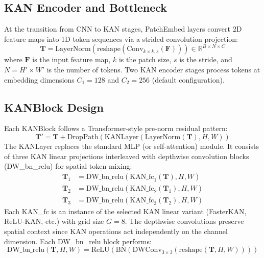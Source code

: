 \documentclass[a4paper]{report}
\begin{document}
\subsection{KAN Encoder and Bottleneck}
At the transition from CNN to KAN stages, PatchEmbed layers convert 2D feature maps into 1D token sequences via a strided convolution projection:
\begin{equation}
    \mathbf{T} = \text{LayerNorm}\left(\text{reshape}\left(\text{Conv}_{k \times k, s}(\mathbf{F})\right)\right) \in \mathbb{R}^{B \times N \times C}
\end{equation}
where $\mathbf{F}$ is the input feature map, $k$ is the patch size, $s$ is the stride, and $N = H' \times W'$ is the number of tokens. Two KAN encoder stages process tokens at embedding dimensions $C_1 = 128$ and $C_2 = 256$ (default configuration).

\subsection{KANBlock Design}
Each KANBlock follows a Transformer-style pre-norm residual pattern:
\begin{equation}
    \mathbf{T}' = \mathbf{T} + \text{DropPath}\left(\text{KANLayer}(\text{LayerNorm}(\mathbf{T}), H, W)\right)
\end{equation}
The KANLayer replaces the standard MLP (or self-attention) module. It consists of three KAN linear projections interleaved with depthwise convolution blocks (DW\_bn\_relu) for spatial token mixing:
\begin{align}
    \mathbf{T}_1 &= \text{DW\_bn\_relu}\left(\text{KAN\_fc}_1(\mathbf{T}), H, W\right) \\
    \mathbf{T}_2 &= \text{DW\_bn\_relu}\left(\text{KAN\_fc}_2(\mathbf{T}_1), H, W\right) \\
    \mathbf{T}_3 &= \text{DW\_bn\_relu}\left(\text{KAN\_fc}_3(\mathbf{T}_2), H, W\right)
\end{align}
Each KAN\_fc is an instance of the selected KAN linear variant (FasterKAN, ReLU-KAN, etc.) with grid size $G=8$. The depthwise convolutions preserve spatial context since KAN operations act independently on the channel dimension. Each DW\_bn\_relu block performs:
\begin{equation}
    \text{DW\_bn\_relu}(\mathbf{T}, H, W) = \text{ReLU}\left(\text{BN}\left(\text{DWConv}_{3\times3}(\text{reshape}(\mathbf{T}, H, W))\right)\right)
\end{equation}
\end{document}
